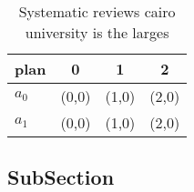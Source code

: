 \documentclass[a4paper]{article}
\begin{document}
\begin{table}
\begin{adjustbox}{width=0.6\columnwidth}
\begin{tabular}{|l|l|l|l|}
\hline
\textbf{plan} & \multicolumn{1}{c|}{\textbf{0}} & \multicolumn{1}{c|}{\textbf{1}} & \multicolumn{1}{c|}{\textbf{2}} \\ \hline
\textbf{$a_0$}  & (0,0) & (1,0) & (2,0) \\ \hline
\textbf{$a_1$}  & (0,0) & (1,0) & (2,0) \\ \hline
\end{tabular}
\end{adjustbox}
\caption{Systematic reviews cairo university is the larges
}
\end{table}

\subsection{SubSection}
\end{document}
